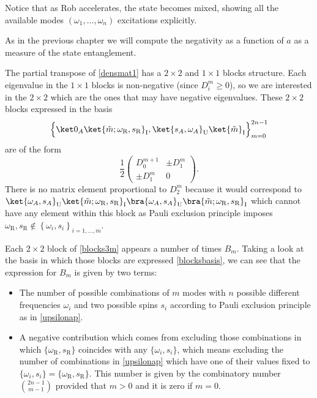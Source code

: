 Notice that as Rob accelerates, the state becomes mixed, showing all the available modes $(\omega_1,\dots,\omega_n)$ excitations explicitly. 

As in the previous chapter we will compute the negativity as a function of $a$ as a measure of the state entanglement.

The partial transpose of \eqref{densmat1} has a $2\times2$ and $1\times1$ blocks structure. Each eigenvalue in the $1\times1$ blocks is non-negative (since 
$D_i^m\ge0$), so we are interested in the $2\times2$ which are the ones that may have negative eigenvalues. These $2\times2$ blocks expressed in the basis
\begin{equation}\label{blocksbasis}
\Big\{\ket0_{A}\ket{\tilde m;\omega_\text{R},s_\text{R}}_\text{I},\ket{s_A,\omega_A}_\text{U}\ket{\tilde m}_\text{I}\Big\}_{m=0}^{2n-1}
\end{equation}
are of the form
\begin{equation}\label{blocks3m}
\frac12
\left(\begin{array}{cc}
D^{m+1}_0 & \pm D_1^m\\
\pm D_1^m & 0
\end{array}\right).
\end{equation}
There is no matrix element proportional to $D_2^m$ because it would correspond to $\ket{\omega_A,s_A}_{\text{U}}\ket{\tilde m;\omega_\text{R},s_\text{R}}_\text{I}\bra{\omega_A,s_A}_{\text{U}}\bra{\tilde m;\omega_\text{R},s_\text{R}}_\text{I}$ 
which cannot have any element within this block as Pauli exclusion principle imposes $\omega_\text{R},s_\text{R}\not\in\left\{\omega_i,s_i\right\}_{i=1,\dots,m}$.

Each $2\times2$ block of \eqref{blocks3m} appears a number of times $B_m$. Taking a look at the basis in which those blocks are expressed \eqref{blocksbasis}, we can see that the expression for $B_m$ is given by two terms:
\begin{itemize}
\item  The number of possible combinations of $m$ modes with $n$ possible different frequencies $\omega_i$ and two possible spins $s_i$ according to Pauli exclusion principle as in \eqref{upsilonap}.
\item A negative contribution which comes from excluding those combinations in which $\{\omega_\text{R},s_\text{R}\}$ coincides with any $\{\omega_i,s_i\}$, which means excluding the number of combinations in \eqref{upsilonap} which have one of their values fixed to $\{\omega_i,s_i\}=\{\omega_\text{R},s_\text{R}\}$. This number is given by the combinatory number $\binom{2n-1}{m-1}$ provided that $m>0$ and it is zero if $m=0$.
\end{itemize}

